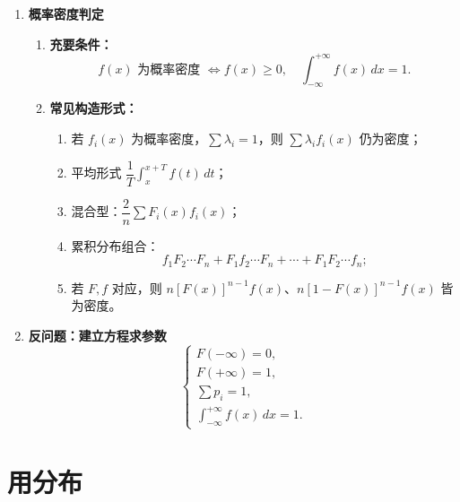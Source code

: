 \begin{enumerate}
      \item \textbf{概率密度判定}
            \begin{enumerate}
                  \item \textbf{充要条件：}
                        \[
                              f(x)\text{ 为概率密度 } \Leftrightarrow
                              f(x)\ge0,\quad
                              \int_{-\infty}^{+\infty}f(x)\,dx=1.
                        \]
                  \item \textbf{常见构造形式：}
                        \begin{enumerate}
                              \item 若 $f_i(x)$ 为概率密度，$\sum\lambda_i=1$，则 $\sum\lambda_i f_i(x)$ 仍为密度；
                              \item 平均形式 $\dfrac{1}{T}\!\int_x^{x+T}\!f(t)\,dt$；
                              \item 混合型：$\dfrac{2}{n}\sum F_i(x)f_i(x)$；
                              \item 累积分布组合：
                                    \[
                                          f_1F_2\cdots F_n + F_1f_2\cdots F_n + \cdots + F_1F_2\cdots f_n;
                                    \]
                              \item 若 $F,f$ 对应，则 $n[F(x)]^{n-1}f(x)$、$n[1-F(x)]^{n-1}f(x)$ 皆为密度。
                        \end{enumerate}
            \end{enumerate}

      \item \textbf{反问题：建立方程求参数}
            \[
                  \begin{cases}
                        F(-\infty)=0, \\
                        F(+\infty)=1, \\
                        \sum p_i = 1, \\
                        \int_{-\infty}^{+\infty} f(x)\,dx = 1.
                  \end{cases}
            \]
\end{enumerate}


\section{用分布}
\DOne


